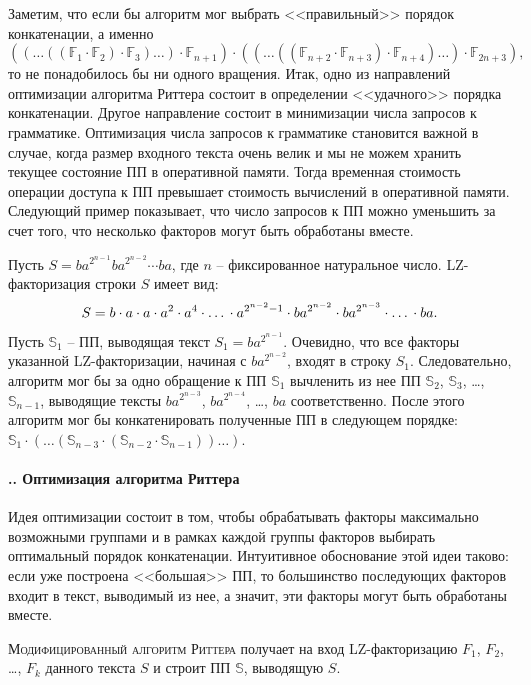 ﻿\documentclass[11pt]{article}
\theoremstyle{remark}
\newcounter{examples}
\newenvironment{example}{\addtocounter{examples}{1}\trivlist\item[\hskip\labelsep{\bf
Пример \arabic{examples}.}] }{\endtrivlist}
\newcommand{\subsectionnew}[1]{
    \addtocounter{subsection}{1}
    \paragraph*{\arabic{section}.\arabic{subsection}. #1}
}
\newcommand{\header}[1]{
    \noindent \textsc{#1}
}
\newcommand{\slp}[1]{\mathbb{#1}}
\begin{document}
Заметим, что если бы алгоритм мог выбрать <<правильный>> порядок конкатенации, а именно
$$((\dots((\slp{F}_1 \cdot \slp{F}_2) \cdot\slp{F}_3) \dots ) \cdot \slp{F}_{n+1})
\cdot ((\dots((\slp{F}_{n+2} \cdot \slp{F}_{n+3}) \cdot \slp{F}_{n+4}) \dots) \cdot\slp{F}_{2n+3}),$$ то не понадобилось бы ни одного
вращения. Итак, одно из направлений оптимизации алгоритма Риттера состоит в определении <<удачного>> порядка конкатенации. Другое
направление состоит в минимизации числа запросов к грамматике. Оптимизация числа запросов к грамматике становится важной в случае, когда
размер входного текста очень велик и мы не можем хранить текущее состояние ПП в оперативной памяти. Тогда временная стоимость операции
доступа к ПП превышает стоимость вычислений в оперативной памяти. Следующий пример показывает, что число запросов к ПП можно уменьшить за
счет того, что несколько факторов могут быть обработаны вместе.

\begin{example}
Пусть $S = ba^{2^{n-1}}ba^{2^{n-2}} \cdots ba$, где $n$ -- фиксированное натуральное число. LZ-факторизация строки $S$ имеет вид:
$$S=b \cdot a \cdot a \cdot a^2 \cdot a^4 \cdot \mbox{\dots} \cdot a^{2^{n-2} - 1} \cdot ba^{2^{n-2}} \cdot ba^{2^{n-3}}
\cdot \mbox{\dots} \cdot ba.$$

Пусть $\slp{S}_1$ -- ПП, выводящая текст $S_1=ba^{2^{n-1}}$. Очевидно, что все факторы указанной LZ-факторизации, начиная с $ba^{2^{n-2}}$,
входят в строку $S_1$. Следовательно, алгоритм мог бы за одно обращение к ПП $\slp{S}_1$ вычленить из нее ПП $\slp{S}_2$, $\slp{S}_3$,
\dots, $\slp{S}_{n-1}$, выводящие тексты $ba^{2^{n-3}}$, $ba^{2^{n-4}}$, \dots, $ba$ соответственно. После этого алгоритм мог бы
конкатенировать полученные ПП в следующем порядке: $\slp{S}_1\cdot(\dots(\slp{S}_{n-3}\cdot(\slp{S}_{n-2} \cdot \slp{S}_{n-1}))\dots)$.
\end{example}

\subsectionnew{Оптимизация алгоритма Риттера}
Идея оптимизации состоит в том, чтобы обрабатывать факторы максимально возможными группами и в рамках каждой группы факторов выбирать
оптимальный порядок конкатенации. Интуитивное обоснование этой идеи таково: если уже построена <<большая>> ПП, то большинство последующих
факторов входит в текст, выводимый из нее, а значит, эти факторы могут быть обработаны вместе.

\medskip

\header{Модифицированный алгоритм Риттера} получает на вход LZ-фак\-то\-ри\-за\-цию $F_1$, $F_2$, \dots, $F_k$ данного текста $S$ и строит
ПП $\slp{S}$, выводящую $S$.
\end{document}
